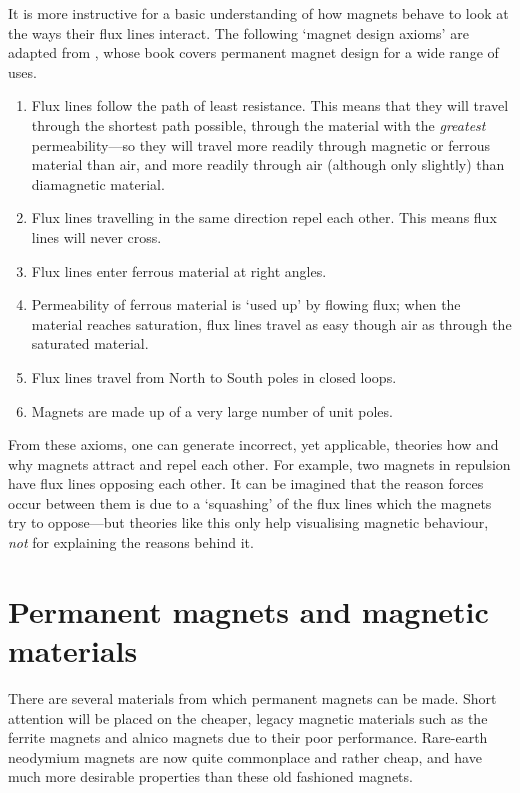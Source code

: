 \documentclass[11pt,a4paper]{memoir}
\begin{document}
It is more instructive for a basic understanding of how magnets behave
to look at the ways their flux lines interact. The following `magnet
design axioms' are adapted from \textcite{moskowitz1995}, whose book
covers permanent magnet design for a wide range of uses.

\begin{enumerate}
\item Flux lines follow the path of least resistance. This means that they will
travel through the shortest path possible,
through the material with the
\emph{greatest} permeability---so they will travel more readily through
magnetic or ferrous material than air, and more readily through air
(although only slightly) than diamagnetic material.

\item Flux lines travelling in the same direction repel each other. This means
flux lines will never cross.

\item Flux lines enter ferrous material at right angles.

\item Permeability of ferrous material is `used up' by flowing flux; when the
material reaches saturation, flux lines travel as easy though air as through
the saturated material.

\item Flux lines travel from North to South poles in closed loops.

\item Magnets are made up of a very large number of unit poles.
\end{enumerate}

From these axioms, one can generate incorrect, yet applicable,
theories how and why magnets attract and repel each other. For
example, two magnets in repulsion have flux lines opposing each
other. It can be imagined that the reason forces occur between them is
due to a `squashing' of the flux lines which the magnets try to
oppose---but theories like this only help visualising magnetic
behaviour, \emph{not} for explaining the reasons behind it.


\section{Permanent magnets and magnetic materials}

There are several materials from which permanent magnets can be
made. Short attention will be placed on the cheaper, legacy magnetic
materials such as the ferrite magnets and alnico magnets due to their
poor performance. Rare-earth neodymium magnets are now quite
commonplace and rather cheap, and have much more desirable properties
than these old fashioned magnets.
\end{document}

